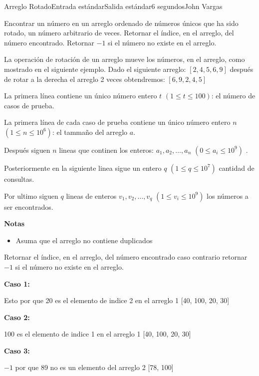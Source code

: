 \begin{problem}{Arreglo Rotado}{Entrada estándar}{Salida estándar}{6 segundos}{}{John Vargas}

Encontrar un número en un arreglo ordenado de números únicos que ha sido rotado, un número arbitrario de veces.
Retornar el índice, en el arreglo, del número encontrado.
Retornar $-1$ si el número no existe en el arreglo.

La operación de rotación de un arreglo mueve los números, en el arreglo, como mostrado en el siguiente ejemplo.
Dado el siguiente arreglo: $[2, 4, 5, 6, 9]$
después de rotar a la derecha el arreglo 2 veces obtendremos: $[6, 9, 2, 4, 5]$
  
\InputFile

La primera línea contiene un único número entero $t$ $(1 \leq t \leq 100)$: el número de casos de prueba.

La primera línea de cada caso de prueba contiene un único número entero $n$ $(1 \leq n \leq 10^6)$: el tammaño del arreglo $a$.

Después siguen $n$ lineas que continen los enteros: $a_1,a_2,…,a_n$ $(0 \leq a_i \leq 10^9)$ .

Posteriormente en la siguiente linea sigue un entero $q$ $(1 \leq q \leq 10^7)$ cantidad de consultas.

Por ultimo siguen $q$ lineas de
enteros $v_1,v_2,…,v_q $ $(1 \leq v_i \leq 10^9)$  los números a ser encontrados.

\textbf{Notas}
\begin{itemize}
    \item Asuma que el arreglo no contiene duplicados
\end{itemize}


\OutputFile

Retornar el índice, en el arreglo, del número encontrado caso contrario
retornar $-1$ si el número no existe en el arreglo.

\Example

\begin{example}
\end{example}

\textbf{Caso 1:}


Esto por que 20 es el elemento de indice 2 en el arreglo 1 [40, 100, 20, 30]


\textbf{Caso 2:}


100 es el elemento de indice 1 en el arreglo 1 [40, 100, 20, 30]


\textbf{Caso 3:}


$-1$ por que 89 no es un elemento del arreglo 2 [78, 100]


\end{problem}


